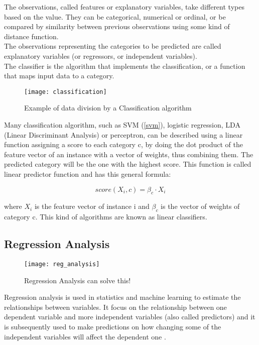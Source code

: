 The observations, called features or explanatory variables, take different types based on the value. They can be categorical, numerical or ordinal, or be compared by similarity between previous observations using some kind of distance function.\\
The observations representing the categories to be predicted are called explanatory variables (or regressors, or independent variables).\\
The classifier is the algorithm that implements the classification, or a function that maps input data to a category.

\begin{figure}[H]
	\centering
	\texttt{[image: classification]}
	\caption{Example of data division by a Classification algorithm}
	\label{fig:classification}
\end{figure}	

Many classification algorithm, such as SVM (\ref{svm}), logistic regression, LDA (Linear Discriminant Analysis) or perceptron, can be described using a linear function assigning a score to each category c, by doing the dot product of the feature vector of an instance with a vector of weights, thus combining them. The predicted category will be the one with the highest score. This function is called linear predictor function and has this general formula:

\begin{equation}
score(X_i, c) = \beta_c \cdot X_i
\end{equation}

where $X_i$ is the feature vector of instance i and $\beta_c$ is the vector of weights of category c. This kind of algorithms are known as linear classifiers.

\subsection{Regression Analysis} \label{regression}
\begin{figure}[H]
	\centering
	\texttt{[image: reg\_analysis]}
	\caption{Regression Analysis can solve this! \cite{reg_analisys}}
	\label{fig:reg_analysis}
\end{figure}
Regression analysis is used in statistics and machine learning to estimate the relationships between variables. It focus on the relationship between one dependent variable and more independent variables (also called predictors) and it is subsequently used to make predictions on how changing some of the  independent variables will affect the dependent one \cite{wiki:reg_an}.

